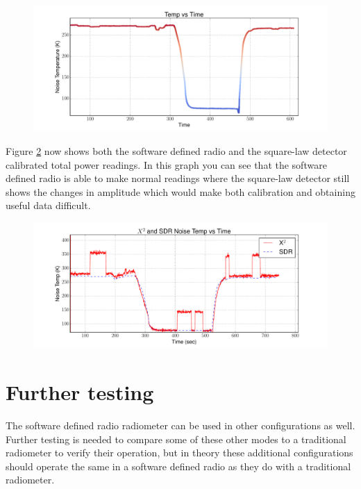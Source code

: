 \begin{figure}[h!tb] \centering

\includegraphics[width=\textwidth]{Experiments/Exp4/calib_filtered.pdf}

\label{sdr_calib_filter}
\end{figure}

Figure \ref{filter_on} now shows both the software defined radio and the square-law detector calibrated total power readings.  In this graph you can see that the software defined radio is able to make normal readings where the square-law detector still shows the changes in amplitude which would make both calibration and obtaining useful data difficult.

\begin{figure}[h!tb] \centering

\includegraphics[width=\textwidth]{Experiments/Exp4/calib_filtered_both.pdf}

\label{filter_on}
\end{figure}


\section{Further testing}
The software defined radio radiometer can be used in other configurations as well.  Further testing is needed to compare some of these other modes to a traditional radiometer to verify their operation, but in theory these additional configurations should operate the same in a software defined radio as they do with a traditional radiometer.